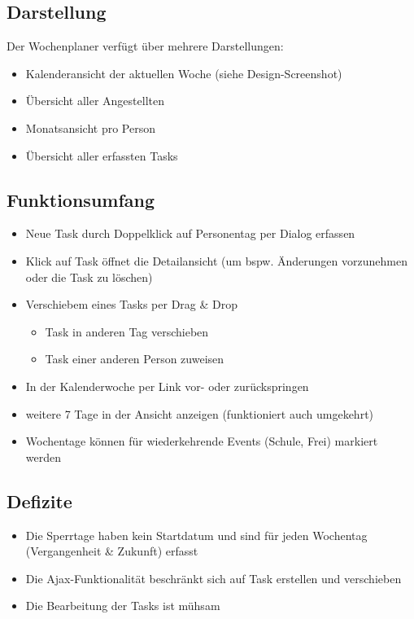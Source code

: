 \subsection{Darstellung}
Der Wochenplaner verfügt über mehrere Darstellungen:
\begin{itemize}
    \item Kalenderansicht der aktuellen Woche (siehe Design-Screenshot)
    \item Übersicht aller Angestellten
    \item Monatsansicht pro Person
    \item Übersicht aller erfassten Tasks
\end{itemize}

\subsection{Funktionsumfang}
\begin{itemize}
    \item Neue Task durch Doppelklick auf Personentag per Dialog erfassen
    \item Klick auf Task öffnet die Detailansicht (um bspw. Änderungen vorzunehmen oder die Task zu löschen)
    \item Verschiebem eines Tasks per Drag \& Drop
    \begin{itemize}
        \item Task in anderen Tag verschieben
        \item Task einer anderen Person zuweisen
    \end{itemize}
    \item In der Kalenderwoche per Link vor- oder zurückspringen
    \item weitere 7 Tage in der Ansicht anzeigen (funktioniert auch umgekehrt)
    \item Wochentage können für wiederkehrende Events (Schule, Frei) markiert werden
\end{itemize}
\subsection{Defizite}
    \begin{itemize}
        \item Die Sperrtage haben kein Startdatum und sind für jeden Wochentag (Vergangenheit \& Zukunft) erfasst
        \item Die Ajax-Funktionalität beschränkt sich auf Task erstellen und verschieben
        \item Die Bearbeitung der Tasks ist mühsam
    \end{itemize}

